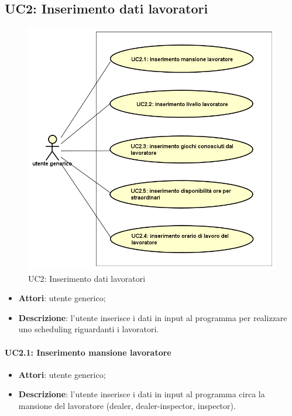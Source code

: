 \subsection{UC2: Inserimento dati lavoratori}
\label{UC2}
\begin{figure}[!h]
    \begin{widepage}
    \def\svgwidth{\columnwidth}
    \includegraphics[width=14.9cm,keepaspectratio]{../immagini/usecase/UC2.png}
    \caption{UC2: Inserimento dati lavoratori}
    \end{widepage}
\end{figure}
\clearpage
\begin{itemize}
    \item \textbf{Attori}: utente generico;
    \item \textbf{Descrizione}: l'utente inserisce i dati in input al programma per realizzare uno scheduling riguardanti i lavoratori.
\end{itemize}
\paragraph{UC2.1: Inserimento mansione lavoratore}
\begin{itemize}
    \item \textbf{Attori}: utente generico;
    \item \textbf{Descrizione}: l'utente inserisce i dati in input al programma circa la mansione del lavoratore (dealer, dealer-inspector, inspector).
\end{itemize}
